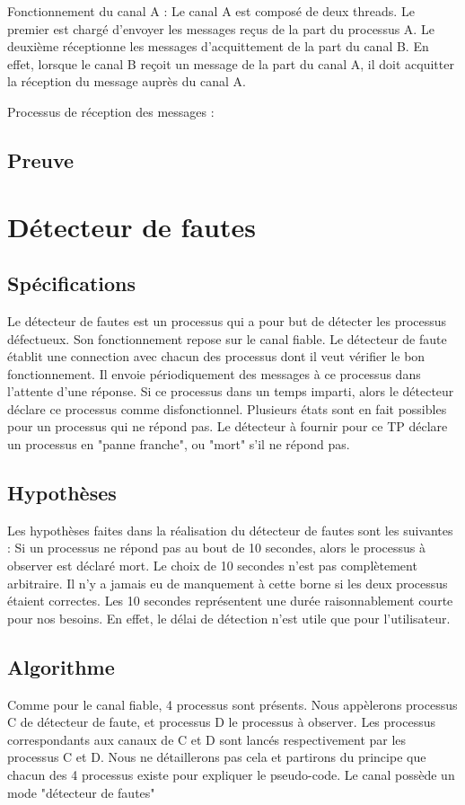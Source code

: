 \documentclass[a4paper, 10pt, french]{article}
\begin{document}
Fonctionnement du canal A :
Le canal A est composé de deux threads. Le premier est chargé d'envoyer les messages reçus de la part du processus A. Le deuxième réceptionne les messages d'acquittement de la part du canal B. En effet, lorsque le canal B reçoit un message de la part du canal A, il doit acquitter la réception du message auprès du canal A.

Processus de réception des messages : 

\subsection{Preuve}


\section{Détecteur de fautes}
\subsection{Spécifications}
Le détecteur de fautes est un processus qui a pour but de détecter les processus défectueux. Son fonctionnement repose sur le canal fiable. \newline
Le détecteur de faute établit une connection avec chacun des processus dont il veut vérifier le bon fonctionnement. Il envoie périodiquement des messages à ce processus dans l'attente d'une réponse. Si ce processus dans un temps imparti, alors le détecteur déclare ce processus comme disfonctionnel. \newline
Plusieurs états sont en fait possibles pour un processus qui ne répond pas. Le détecteur à fournir pour ce TP déclare un processus en "panne franche", ou "mort" s'il ne répond pas.

\subsection{Hypothèses}
Les hypothèses faites dans la réalisation du détecteur de fautes sont les suivantes :\newline
Si un processus ne répond pas au bout de 10 secondes, alors le processus à observer est déclaré mort. Le choix de 10 secondes n'est pas complètement arbitraire. Il n'y a jamais eu de manquement à cette borne si les deux processus étaient correctes. Les 10 secondes représentent une durée raisonnablement courte pour nos besoins. En effet, le délai de détection n'est utile que pour l'utilisateur.

\subsection{Algorithme}
Comme pour le canal fiable, 4 processus sont présents. Nous appèlerons processus C de détecteur de faute, et processus D le processus à observer. Les processus correspondants aux canaux de C et D sont lancés respectivement par les processus C et D. Nous ne détaillerons pas cela et partirons du principe que chacun des 4 processus existe pour expliquer le pseudo-code. Le canal possède un mode "détecteur de fautes"
\end{document}
